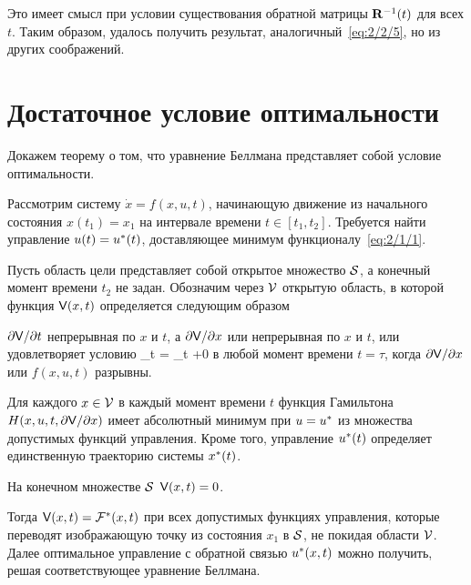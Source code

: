 Это имеет смысл при условии существования обратной матрицы $\mathbf{R}^{-1}(t)$ для всех $t$. Таким образом, удалось получить результат, аналогичный~\vref{eq:2/2/5}, но из других соображений.



\section{Достаточное условие оптимальности}



Докажем теорему о том, что уравнение Беллмана представляет собой условие оптимальности\cite{TCHAMRAN}.

\begin{teo}
	Рассмотрим систему $\dot{x} = f(x, u, t)$, начинающую движение из начального состояния $x(t_1) = x_1$ на интервале времени $t \in [t_1, t_2]$. Требуется найти управление $u(t) = u^{*}(t)$, доставляющее минимум функционалу~\vref{eq:2/1/1}.
	
	Пусть область цели представляет собой открытое множество $\mathcal{S}$, а конечный момент времени $t_2$ не задан. Обозначим через $\mathcal{V}$ открытую область, в которой функция $\mathsf{V}(x, t)$ определяется следующим образом
	
	\benum
		\item
			$\partial {  \mathsf{V}  } / \partial {t}$ непрерывная по $x$ и $t$, а $\partial {  \mathsf{V}  } / \partial {x}$ или непрерывная по $x$ и $t$, или удовлетворяет условию
    			\lim\limits_{t \to {}}  = \lim\limits_{t \to \tau+0} 
			\eeq
			в любой момент времени $t = \tau$, когда $\partial {  \mathsf{V}  } / \partial {x}$ или $f(x, u, t)$ разрывны.
			
		\item
			Для каждого $x \in \mathcal{V}$ в каждый момент времени $t$ функция Гамильтона $H(x, u, t, \partial {  \mathsf{V}  } / \partial {x})$ имеет абсолютный минимум при $u = u^{*}$ из множества допустимых функций управления. Кроме того, управление $u^{*}(t)$ определяет единственную траекторию системы $x^{*}(t)$.
			
		\item
			На конечном множестве $\mathcal{S}$ $\mathsf{V}(x, t) = 0$.
	\eenum
	
	Тогда $\mathsf{V}(x, t) = \mathcal{F}^{*}(x, t)$ при всех допустимых функциях управления, которые переводят изображающую точку из состояния $x_1$ в $\mathcal{S}$, не покидая области $\mathcal{V}$. Далее оптимальное управление с обратной связью $u^{*}(x, t)$ можно получить, решая соответствующее уравнение Беллмана.
\end{teo}


